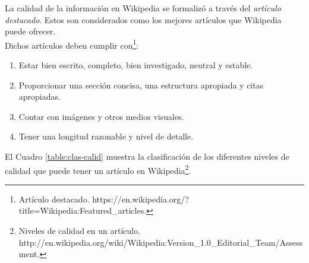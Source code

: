 La calidad de la informaci\'on en Wikipedia se formaliz\'o a trav\'es del \emph{art\'iculo destacado}. Estos son considerados como los mejores art\'iculos que Wikipedia puede ofrecer. \\

Dichos art\'iculos deben cumplir con\footnote{Art\'iculo destacado. https://en.wikipedia.org/?title=Wikipedia:Featured\_articles.
}:

\begin{enumerate}
	\item Estar bien escrito, completo, bien investigado, neutral y estable.
	\item Proporcionar una secci\'on concisa, una estructura apropiada y citas apropiadas.
	\item Contar con im\'agenes y otros medios visuales.
	\item Tener una longitud razonable y nivel de detalle.
\end{enumerate}

El Cuadro \ref{table:clas-calid}  muestra la clasificaci\'on de los diferentes niveles de calidad que puede tener un art\'iculo en Wikipedia\footnote{Niveles de calidad en un art\'iculo. \\ http://en.wikipedia.org/wiki/Wikipedia:Version\_1.0\_Editorial\_Team/Assessment. }.

